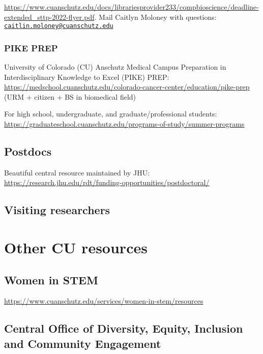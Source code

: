 \documentclass[
  letterpaper,
  DIV=11,
  numbers=noendperiod]{scrreprt}
\begin{document}
\url{https://www.cuanschutz.edu/docs/librariesprovider233/compbioscience/deadline-extended_sttp-2022-flyer.pdf}.
Mail Caitlyn Moloney with questions:
\href{mailto:caitlin.moloney@cuanschutz.edu}{\nolinkurl{caitlin.moloney@cuanschutz.edu}}

\hypertarget{pike-prep}{%
\subsection{PIKE PREP}\label{pike-prep}}

University of Colorado (CU) Anschutz Medical Campus Preparation in
Interdisciplinary Knowledge to Excel (PIKE) PREP:
\url{https://medschool.cuanschutz.edu/colorado-cancer-center/education/pike-prep}
(URM + citizen + BS in biomedical field)

For high school, undergraduate, and graduate/professional students:
\url{https://graduateschool.cuanschutz.edu/programs-of-study/summer-programs}

\hypertarget{postdocs}{%
\section{Postdocs}\label{postdocs}}

Beautiful central resource maintained by JHU:
\url{https://research.jhu.edu/rdt/funding-opportunities/postdoctoral/}

\hypertarget{visiting-researchers}{%
\section{Visiting researchers}\label{visiting-researchers}}


\hypertarget{other-cu-resources}{%
\chapter{Other CU resources}\label{other-cu-resources}}

\hypertarget{women-in-stem}{%
\section{Women in STEM}\label{women-in-stem}}

\url{https://www.cuanschutz.edu/services/women-in-stem/resources}

\hypertarget{central-office-of-diversity-equity-inclusion-and-community-engagement}{%
\section{Central Office of Diversity, Equity, Inclusion and Community
Engagement}\label{central-office-of-diversity-equity-inclusion-and-community-engagement}}
\end{document}
